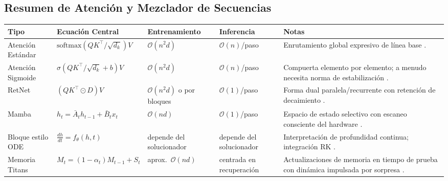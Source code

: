 \documentclass[11pt,a4paper]{article}
\begin{document}
\subsection{Resumen de Atención y Mezclador de Secuencias}
\small
\begin{longtable}{p{2.4cm}p{3.2cm}p{2.0cm}p{2.0cm}p{4.8cm}}
\toprule
\textbf{Tipo} & \textbf{Ecuación Central} & \textbf{Entrenamiento} & \textbf{Inferencia} & \textbf{Notas} \\
\midrule
\endhead
Atención Estándar & $\text{softmax}(QK^\top/\sqrt{d_k})V$ & $\mathcal{O}(n^2d)$ & $\mathcal{O}(n)$/paso & Enrutamiento global expresivo de línea base \citep{vaswani_attention_2017}. \\
Atención Sigmoide & $\sigma(QK^\top/\sqrt{d_k}+b)V$ & $\mathcal{O}(n^2d)$ & $\mathcal{O}(n)$/paso & Compuerta elemento por elemento; a menudo necesita norma de estabilización \citep{ramapuram_theory_2024}. \\
RetNet & $(QK^\top\odot D)V$ & $\mathcal{O}(n^2d)$ o por bloques & $\mathcal{O}(1)$/paso & Forma dual paralela/recurrente con retención de decaimiento \citep{sun_retentive_2023}. \\
Mamba & $h_t=\bar{A}_t h_{t-1}+\bar{B}_t x_t$ & $\mathcal{O}(nd)$ & $\mathcal{O}(1)$/paso & Espacio de estado selectivo con escaneo consciente del hardware \citep{gu_mamba_2023}. \\
Bloque estilo ODE & $\frac{dh}{dt}=f_\theta(h,t)$ & depende del solucionador & depende del solucionador & Interpretación de profundidad continua; integración RK \citep{zhang_continuous_2021}. \\
Memoria Titans & $M_t=(1-\alpha_t)M_{t-1}+S_t$ & aprox.\ $\mathcal{O}(nd)$ & centrada en recuperación & Actualizaciones de memoria en tiempo de prueba con dinámica impulsada por sorpresa \citep{behrouz_titans_2025}. \\
\bottomrule
\end{longtable}
\normalsize
\end{document}
